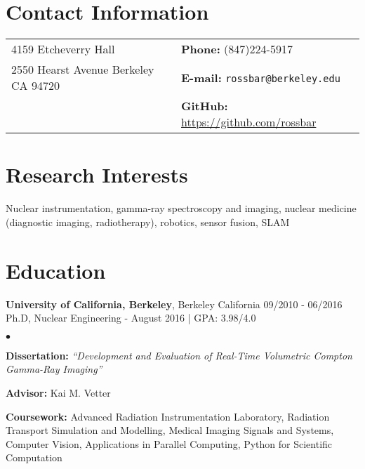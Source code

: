 \documentclass[margin,line]{res}
\newenvironment{list2}{
  \begin{list}{$\bullet$}{%
      \setlength{\itemsep}{0in}
      \setlength{\parsep}{0in} \setlength{\parskip}{0in}
      \setlength{\topsep}{0in} \setlength{\partopsep}{0in} 
      \setlength{\leftmargin}{0.2in}}}{\end{list}}
\begin{document}
\address{\large Assistant Research Scientist \& Lecturer}
\address{\large University of California, Berkeley}

\begin{resume}
\section{\sc Contact Information}
\vspace{.05in}
\begin{tabular}{@{}p{3in}p{4in}}
4159 Etcheverry Hall                  & {\bf Phone:}   (847)224-5917 \\            
2550 Hearst Avenue Berkeley CA 94720  & {\bf E-mail:}  {\tt rossbar@berkeley.edu} \\       
                                      & {\bf GitHub:} \url{https://github.com/rossbar} \\     
\end{tabular}


\section{\sc Research Interests}
Nuclear instrumentation, gamma-ray spectroscopy and imaging, nuclear medicine
(diagnostic imaging, radiotherapy), robotics, sensor fusion, SLAM

\section{\sc Education}
{\bf University of California, Berkeley}, Berkeley California \hfill 09/2010 - 06/2016\\
Ph.D, Nuclear Engineering - August 2016 | GPA: 3.98/4.0
\begin{list2}
\item {\bf \small Dissertation:} {\em``Development and Evaluation of Real-Time
                                        Volumetric Compton Gamma-Ray Imaging''} 
\item {\bf \small Advisor:}  Kai M. Vetter
\item {\bf \small Coursework:} Advanced Radiation Instrumentation Laboratory,
                               Radiation Transport Simulation and Modelling,
                               Medical Imaging Signals and Systems, Computer
                               Vision, Applications in Parallel Computing,
                               Python for Scientific Computation
\end{list2}


\end{resume}
\end{document}
